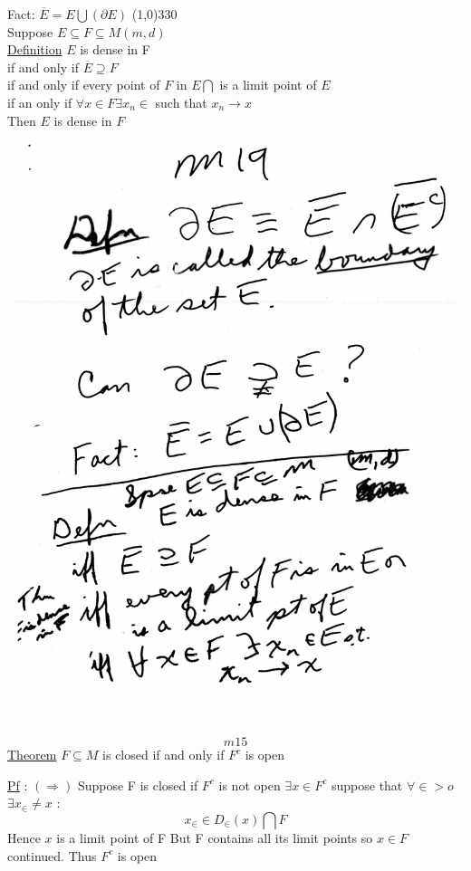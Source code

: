 \documentclass[10pt,a4paper]{article}
\begin{document}
{{\begin{flushleft}
Fact: $\overline{E} = E \bigcup (\partial E)$
\line(1,0){330} \\
Suppose $E \subseteq F \subseteq M (m,d)$\\
\underline{Definition} $E$ is dense in F\\ if and only if $\overline{E} \supseteq F$\\ if and only if every point of $F$ in $E \bigcap$ is a limit point of $E$\\ if an only if $\forall x \in F \exists x_n \in$ such that $x_n \rightarrow x$\\ Then $E$ is dense in $F$
\includegraphics[scale=.4]{Pages/MS_19}

\end{flushleft}
\newpage

$$m15$$
\underline{Theorem} $F\subseteq M$ is closed if and only if $F^c$ is open
 
\underline{Pf} : $(\Rightarrow)$ Suppose F is closed if $F^c$ is not open $\exists  x \in F^c$ suppose that $\forall \in > o$ $\exists x_\in \neq x$ :
 $$x_\in \in D_\in (x) \bigcap F$$
Hence $x$ is a limit point of F But F contains all its limit points so $x \in F$ continued. Thus $F^c$ is open

}}
\end{document}
